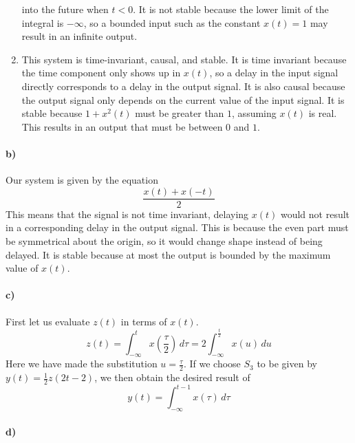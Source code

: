 \documentclass[12pt]{article}
\begin{document}
\begin{enumerate}
    into the future when \(t<0\). It is not stable because the lower limit of the integral is \(-\infty\), so a bounded input such as the constant \(x(t)=1\) may result in an infinite output.
    \item This system is time-invariant, causal, and stable. It is time invariant because the time component only shows up in \(x(t)\), so a delay in the input signal directly corresponds to a delay in the output signal.
    It is also causal because the output signal only depends on the current value of the input signal. It is stable because \(1+x^2(t)\) must be greater than \(1\), assuming \(x(t)\) is real. This results in an output that
    must be between \(0\) and \(1\).
\end{enumerate}

\paragraph{b)}

Our system is given by the equation
\[\frac{x(t)+x(-t)}{2}\]
This means that the signal is not time invariant, delaying \(x(t)\) would not result in a corresponding delay in the output signal. This is because the even part must be symmetrical about the origin, so
it would change shape instead of being delayed. It is stable because at most the output is bounded by the maximum value of \(x(t)\).

\paragraph{c)}

First let us evaluate \(z(t)\) in terms of \(x(t)\).
\[z(t)=\int_{-\infty}^t x\left(\frac{\tau}{2}\right)\,d\tau = 2\int_{-\infty}^{\frac{t}{2}}x(u)\,du\]
Here we have made the substitution \(u=\frac{\tau}{2}\). If we choose \(S_3\) to be given by \(y(t)=\frac{1}{2}z(2t-2)\), we
then obtain the desired result of
\[y(t)=\int_{-\infty}^{t-1}x(\tau)\,d\tau\]

\pagebreak

\paragraph{d)}
\end{document}
